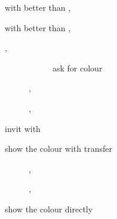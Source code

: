 \documentclass[../polish_club.tex]{subfiles}
\begin{document}

\begin{description}
  \item[] \PassOrCorrect{} with better \SpadeSymbol{} than \HeartSymbol, 
    \begin{description}
      \item[\PassBid] 
      \item[] 
    \end{description}
  \item[] \PassOrCorrect{} with better \HeartSymbol{} than \SpadeSymbol, 
    \begin{description}
      \item[\PassBid] 
      \item[] 
    \end{description}
  \item[] \Relay, 
    \begin{description}
      \item[] 
        \begin{description}
          \item[] ask for colour
            \begin{description}
              \item[] 
              \item[] 
            \end{description}
        \end{description}
      \item[] , 
      \item[] , 
    \end{description}
  \item[]
  \item[] invit with 
  \item[] show the colour with transfer
    \begin{description}
      \item[] \Transfer{\HeartSymbol}, 
      \item[] \Transfer{\SpadeSymbol}, 
    \end{description}
  \item[] show the colour directly
    \begin{description}
      \item[] 
      \item[] 
    \end{description}
\end{description}
\end{document}
